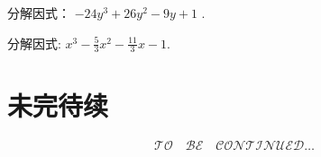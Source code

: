 \documentclass[aspectratio=169]{ctexbeamer}
\theoremstyle{definition}
\begin{document}
\begin{frame}[t]
	\begin{example}
		分解因式： $-24 y^{3}+26 y^{2}-9 y+1$ . 
	\end{example}
\end{frame}

\begin{frame}[t]
	\begin{example}
		分解因式: $x^{3}-\frac{5}{3} x^{2}-\frac{11}{3} x-1$.
	\end{example}
\end{frame}

\section*{未完待续}
\begin{frame}
	\Huge
	$$
		\mathcal{TO}	\quad
		\mathcal{BE}  	\quad
		\mathcal{CONTINUED}
		\ldots
	$$
\end{frame}
\end{document}

